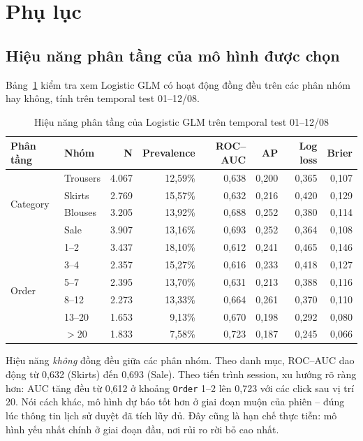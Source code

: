 
\section{Phụ lục}

\subsection{Hiệu năng phân tầng của mô hình được chọn}

Bảng~\ref{tab:subgroup} kiểm tra xem Logistic GLM có hoạt động đồng đều trên các
phân nhóm hay không, tính trên temporal test 01--12/08.

\begin{table}[H]
\centering
\caption{Hiệu năng phân tầng của Logistic GLM trên temporal test 01--12/08}
\label{tab:subgroup}
\small
\begin{tabular}{llrrrrrr}
\toprule
\textbf{Phân tầng} & \textbf{Nhóm} & \textbf{N} & \textbf{Prevalence}
& \textbf{ROC--AUC} & \textbf{AP} & \textbf{Log loss} & \textbf{Brier} \\
\midrule
\multirow{4}{*}{Category}
 & Trousers & 4.067 & 12,59\% & 0,638 & 0,200 & 0,365 & 0,107 \\
 & Skirts   & 2.769 & 15,57\% & 0,632 & 0,216 & 0,420 & 0,129 \\
 & Blouses  & 3.205 & 13,92\% & 0,688 & 0,252 & 0,380 & 0,114 \\
 & Sale     & 3.907 & 13,16\% & 0,693 & 0,252 & 0,364 & 0,108 \\
\midrule
\multirow{6}{*}{Order}
 & 1--2   & 3.437 & 18,10\% & 0,612 & 0,241 & 0,465 & 0,146 \\
 & 3--4   & 2.357 & 15,27\% & 0,616 & 0,233 & 0,418 & 0,127 \\
 & 5--7   & 2.395 & 13,70\% & 0,631 & 0,213 & 0,388 & 0,116 \\
 & 8--12  & 2.273 & 13,33\% & 0,664 & 0,261 & 0,370 & 0,110 \\
 & 13--20 & 1.653 & 9,13\%  & 0,670 & 0,198 & 0,292 & 0,080 \\
 & $>$20  & 1.833 & 7,58\%  & 0,723 & 0,187 & 0,245 & 0,066 \\
\bottomrule
\end{tabular}
\end{table}

Hiệu năng \emph{không} đồng đều giữa các phân nhóm. Theo danh mục, ROC--AUC dao
động từ 0,632 (Skirts) đến 0,693 (Sale). Theo tiến trình session, xu hướng rõ
ràng hơn: AUC tăng đều từ 0,612 ở khoảng \texttt{Order} 1--2 lên 0,723 với các
click sau vị trí 20. Nói cách khác, mô hình dự báo tốt hơn ở giai đoạn muộn của
phiên -- đúng lúc thông tin lịch sử duyệt đã tích lũy đủ. Đây cũng là hạn chế
thực tiễn: mô hình yếu nhất chính ở giai đoạn đầu, nơi rủi ro rời bỏ cao nhất.

